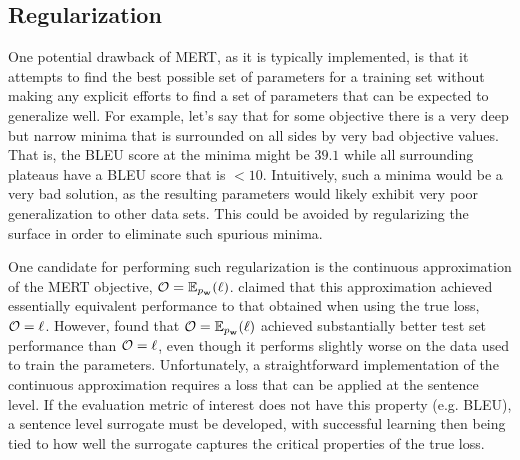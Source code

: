 \documentclass[11pt]{article}
\begin{document}
\subsection{Regularization}


One potential drawback of MERT, as it is typically implemented, is that it attempts to find the best possible set of parameters for a training set without making any explicit efforts to find a set of parameters that can be expected to generalize well. For example, let's say that for some objective there is a very deep but narrow minima that is surrounded on all sides by very bad objective values. That is, the BLEU score at the minima might be \mbox{$39.1$} while all surrounding plateaus have a BLEU score that is \mbox{$< 10$}. Intuitively, such a minima would be a very bad solution, as the resulting parameters would likely exhibit very poor generalization to other data sets. This could be avoided by regularizing the surface in order to eliminate such spurious minima. 

One candidate for performing such regularization is the continuous approximation of the MERT objective, \mbox{${\cal O} = \mathbb{E}_{p_{\bf w}}({\ell})$}.  claimed that this approximation achieved essentially equivalent performance to that obtained when using the true loss, \mbox{${\cal O} = \ell$}. However,  found that \mbox{${\cal O} = \mathbb{E}_{p_{\bf w}}({\ell})$} achieved substantially better test set performance than \mbox{${\cal O} = \ell$}, even though it performs slightly worse on the data used to train the parameters. Unfortunately, a straightforward implementation of the continuous approximation requires a loss that can be applied at the sentence level. If the evaluation metric of interest does not have this property (e.g. BLEU), a sentence level surrogate must be developed, with successful learning then being tied to how well the surrogate captures the critical properties of the true loss.  
\end{document}
